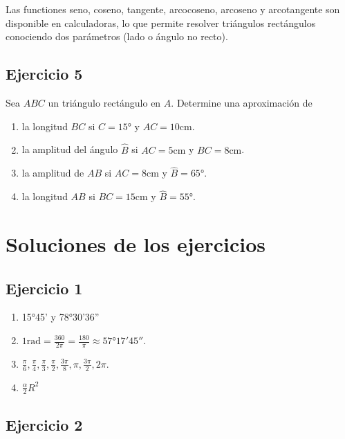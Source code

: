 Las functiones seno, coseno, tangente, arcocoseno,  arcoseno y arcotangente
son disponible en calculadoras, lo que permite resolver triángulos rectángulos
conociendo dos parámetros (lado o ángulo no recto).

\subsection{Ejercicio 5}

Sea $ABC$ un triángulo rectángulo en $A$. Determine una aproximación de

\begin{enumerate}
\item la longitud $BC$ si $\widehat{C} = 15°$ y $AC = 10\text{cm}$.
\item la amplitud del ángulo $\widehat{B}$ si $AC = 5\text{cm}$ y
  $BC = 8\text{cm}$.
\item la amplitud de $AB$ si $AC = 8\text{cm}$ y $\widehat{B} = 65°$.
\item la longitud $AB$ si $BC = 15\text{cm}$ y $\widehat{B} = 55°$.
\end{enumerate}

\section{Soluciones de los ejercicios }

\subsection{Ejercicio 1}

\begin{enumerate}
\item 15°45' y 78°30'36''
\item $1 \text{rad} = \frac{360}{2\pi} = \frac{180}{\pi} \approx
  57°17'45''$.
\item $\frac{\pi}{6}, \frac{\pi}{4}, \frac{\pi}{3}, \frac{\pi}{2}, 
  \frac{3\pi}{8}, \pi, \frac{3\pi}{2}, 2\pi$.
\item $\frac{\alpha}{2} R^2$
\end{enumerate}

\subsection{Ejercicio 2}

